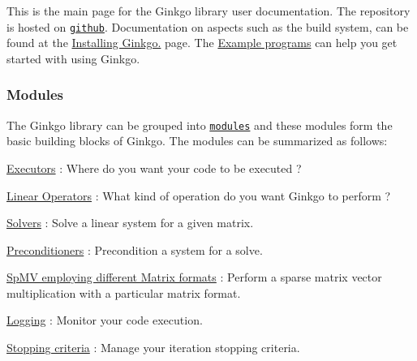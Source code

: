 This is the main page for the Ginkgo library user documentation. The repository is hosted on \href{https://github.com/ginkgo-project/ginkgo}{\tt github}. Documentation on aspects such as the build system, can be found at the \hyperlink{install_ginkgo}{Installing Ginkgo.} page. The \hyperlink{Examples}{Example programs} can help you get started with using Ginkgo.

\subsubsection*{Modules}

The Ginkgo library can be grouped into \href{modules.html}{\tt modules} and these modules form the basic building blocks of Ginkgo. The modules can be summarized as follows\+:


\begin{DoxyItemize}
\item \hyperlink{group__Executor}{Executors} \+: Where do you want your code to be executed ?
\item \hyperlink{group__LinOp}{Linear Operators} \+: What kind of operation do you want Ginkgo to perform ?
\begin{DoxyItemize}
\item \hyperlink{group__solvers}{Solvers} \+: Solve a linear system for a given matrix.
\item \hyperlink{group__precond}{Preconditioners} \+: Precondition a system for a solve.
\item \hyperlink{group__mat__formats}{Sp\+MV employing different Matrix formats} \+: Perform a sparse matrix vector multiplication with a particular matrix format.
\end{DoxyItemize}
\item \hyperlink{group__log}{Logging} \+: Monitor your code execution.
\item \hyperlink{group__stop}{Stopping criteria} \+: Manage your iteration stopping criteria. 
\end{DoxyItemize}